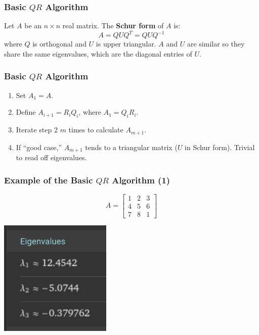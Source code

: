 \documentclass{beamer}
\begin{document}
\begin{frame}
	\frametitle{Basic $QR$ Algorithm}
	\begin{tcolorbox}[title={Schur form},colback=blue!5!white,colframe=blue!75!black,parbox=false]
		Let $A$ be an $n\times n$ real matrix. The \textbf{Schur form} of $A$ is:
		\begin{equation*}
			A=QUQ^T=QUQ^{-1}
		\end{equation*}
		where $Q$ is orthogonal and $U$ is upper triangular. $A$ and $U$ are similar so they share the same eigenvalues, which are the diagonal entries of $U$.
	\end{tcolorbox}
\end{frame}

\begin{frame}
	\frametitle{Basic $QR$ Algorithm}
	\begin{tcolorbox}[title={Basic $QR$ Algorithm},colback=red!5!white,colframe=red!75!black,parbox=false]
		\begin{enumerate}
			\item<2-> Set $A_1=A$.
			\item<3-> Define $A_{i+1}=R_iQ_i$, where $A_1=Q_iR_i$.
			\item<4-> Iterate step 2 $m$ times to calculate $A_{m+1}$.
			\item<5-> If ``good case,'' $A_{m+1}$ tends to a triangular matrix ($U$ in Schur form). Trivial to read off eigenvalues.
		\end{enumerate}
	\end{tcolorbox}
\end{frame}

\begin{frame}
	\frametitle{Example of the Basic $QR$ Algorithm (1)}
	\begin{equation*}
	    A=\begin{bmatrix}
			1 & 2 & 3 \\
			4 & 5 & 6 \\
			7 & 8 & 1
	    \end{bmatrix}
	\end{equation*}
	\begin{center}
		\includegraphics[width=0.4\textwidth]{eigenvalues.png}
	\end{center}
\end{frame}
\end{document}
